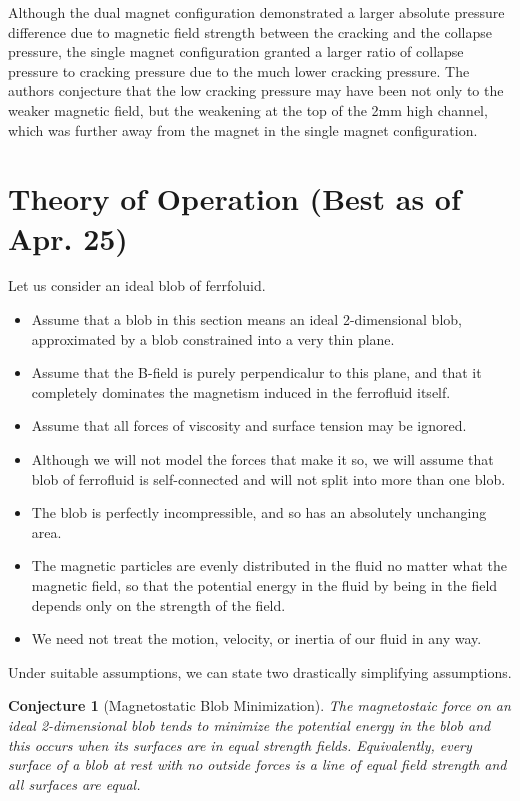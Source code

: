 \documentclass[]{asme2ej}
\newtheorem{conjecture}{Conjecture}
\begin{document}
Although the dual magnet configuration demonstrated a larger absolute
pressure difference due to magnetic field strength between the
cracking and the collapse pressure, the single magnet configuration
granted a larger ratio of collapse pressure to cracking
pressure due to the much lower cracking pressure.
The authors conjecture that the low cracking pressure may have
been not only to the weaker magnetic field, but the weakening at the
top of the 2mm high channel, which was further away from the magnet
in the single magnet configuration.

\section{Theory of Operation (Best as of Apr. 25)}

Let us consider an ideal blob of ferrfoluid.
\begin{itemize}
\item Assume that a blob in this section means an ideal 2-dimensional blob,
approximated by a blob constrained into a very thin plane.
\item Assume that the B-field is purely perpendicalur to this plane,
and that it completely dominates the magnetism induced in
the ferrofluid itself.
\item Assume that all forces of viscosity and surface tension may
  be ignored.
\item Although we will not model the forces that make it so,
  we will assume that blob of ferrofluid is self-connected and
  will not split into more than one blob.
\item The blob is perfectly incompressible, and so
  has an absolutely unchanging area.
\item The magnetic particles are evenly distributed in the
  fluid no matter what the magnetic field, so that the potential
  energy in the fluid by being in the field depends only on the
  strength of the field.
\item We need not treat the motion, velocity, or inertia of
  our fluid in any way.
\end{itemize}
Under suitable assumptions, we can state two drastically
simplifying assumptions.

\begin{conjecture}[Magnetostatic Blob Minimization]
  \label{conj:mbf}
  The magnetostaic force on an ideal 2-dimensional blob
  tends to minimize the potential energy in the blob
  and this occurs when its surfaces are in equal strength fields.
  Equivalently, every surface of a blob at rest with no outside
  forces is a line of equal field strength and all surfaces are equal.
\end{conjecture}
\end{document}
